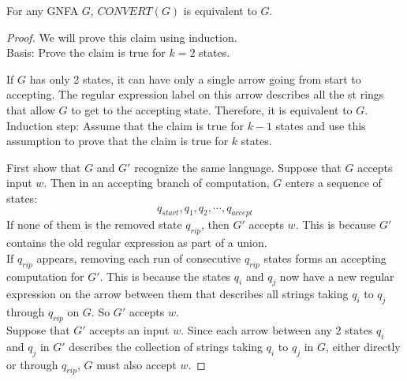 \documentclass[11pt,a4paper]{article}
\begin{document}
\begin{claim}
    For any GNFA $G$, $CONVERT(G)$ is equivalent to $G$. \\

    \begin{proof}
        We will prove this claim using induction. \\

        Basis: Prove the claim is true for $k=2$ states.

        If $G$ has only 2 states, it can have only a single arrow going from start to accepting.
        The regular expression label on this arrow describes all the st rings that allow $G$ to get to the accepting state.
        Therefore, it is equivalent to $G$. \\

        Induction step: Assume that the claim is true for $k-1$ states and use this assumption to prove that the claim is true for $k$ states.

        First show that $G$ and $G'$ recognize the same language. Suppose that $G$ accepts input $w$. Then in an accepting branch of computation, $G$ enters a sequence of states: $$q_{start},q_1,q_2,\cdots,q_{accept}$$
        If none of them is the removed state $q_{rip}$, then $G'$ accepts $w$. This is because $G'$ contains the old regular expression as part of a union. \\

        If $q_{rip}$ appears, removing each run of consecutive $q_{rip}$ states forms an accepting computation for $G'$.
        This is because the states $q_i$ and $q_j$ now have a new regular expression on the arrow between them that describes all strings taking $q_i$ to $q_j$ through $q_{rip}$ on $G$. So $G'$ accepts $w$. \\

        Suppose that $G'$ accepts an input $w$. Since each arrow between any 2 states $q_i$ and $q_j$ in $G'$ describes the collection of strings taking $q_i$ to $q_j$ in $G$, either directly or through $q_{rip}$, $G$ must also accept $w$.
    \end{proof}

\end{claim}
\end{document}
